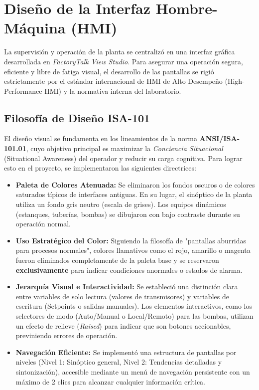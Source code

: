 \clearpage
\section{Diseño de la Interfaz Hombre-Máquina (HMI)}
La supervisión y operación de la planta se centralizó en una interfaz gráfica desarrollada en \textit{FactoryTalk View Studio}. Para asegurar una operación segura, eficiente y libre de fatiga visual, el desarrollo de las pantallas se rigió estrictamente por el estándar internacional de HMI de Alto Desempeño (High-Performance HMI) y la normativa interna del laboratorio.

\subsection{Filosofía de Diseño ISA-101}
El diseño visual se fundamenta en los lineamientos de la norma \textbf{ANSI/ISA-101.01}, cuyo objetivo principal es maximizar la \textit{Conciencia Situacional} (Situational Awareness) del operador y reducir su carga cognitiva. Para lograr esto en el proyecto, se implementaron las siguientes directrices:

\begin{itemize}
    \item \textbf{Paleta de Colores Atenuada:} Se eliminaron los fondos oscuros o de colores saturados típicos de interfaces antiguas. En su lugar, el sinóptico de la planta utiliza un fondo gris neutro (escala de grises). Los equipos dinámicos (estanques, tuberías, bombas) se dibujaron con bajo contraste durante su operación normal.
    \item \textbf{Uso Estratégico del Color:} Siguiendo la filosofía de "pantallas aburridas para procesos normales", colores llamativos como el rojo, amarillo o magenta fueron eliminados completamente de la paleta base y se reservaron \textbf{exclusivamente} para indicar condiciones anormales o estados de alarma. 
    \item \textbf{Jerarquía Visual e Interactividad:} Se estableció una distinción clara entre variables de solo lectura (valores de transmisores) y variables de escritura (Setpoints o salidas manuales). Los elementos interactivos, como los selectores de modo (Auto/Manual o Local/Remoto) para las bombas, utilizan un efecto de relieve (\textit{Raised}) para indicar que son botones accionables, previniendo errores de operación.
    \item \textbf{Navegación Eficiente:} Se implementó una estructura de pantallas por niveles (Nivel 1: Sinóptico general, Nivel 2: Tendencias detalladas y sintonización), accesible mediante un menú de navegación persistente con un máximo de 2 clics para alcanzar cualquier información crítica.
\end{itemize}


